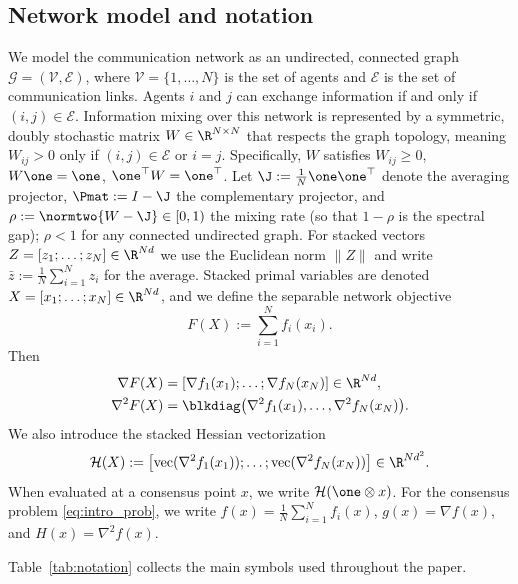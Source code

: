 \documentclass[review,onefignum,onetabnum]{siamart171218}
\begin{document}
	\subsection{Network model and notation}
	We model the communication network as an undirected, connected
	graph $\mathcal{G} = (\mathcal{V}, \mathcal{E})$, where
	$\mathcal{V} = \{1, \dots, N\}$ is the set of agents and
	$\mathcal{E}$ is the set of communication links.
	Agents $i$ and $j$ can exchange information if and only if
	$(i,j) \in \mathcal{E}$.
	Information mixing over this network is represented by a symmetric,
	doubly stochastic matrix $W \in \R^{N \times N}$ that respects
	the graph topology, meaning $W_{ij} > 0$ only if
	$(i,j) \in \mathcal{E}$ or $i=j$.
	Specifically, $W$ satisfies
	$W_{ij}\ge0$, $W\one=\one$, $\one^\top W=\one^\top$.
	Let $\J:=\frac{1}{N}\one\one^\top$ denote the averaging projector,
	$\Pmat:=I-\J$ the complementary projector, and
	$\rho := \normtwo{W-\J}\in[0,1)$ the mixing rate (so that $1{-}\rho$ is the spectral gap);
	$\rho<1$ for any connected undirected graph.
	For stacked vectors $Z=[z_1;\dots;z_N]\in\R^{Nd}$ we use the
	Euclidean norm $\|Z\|$ and write $\bar z:=\frac1N\sum_{i=1}^N z_i$
	for the average.
	Stacked primal variables are denoted
	$X=[x_1;\dots;x_N]\in\R^{Nd}$, and we define the separable
	network objective
	\[
	F(X):=\sum_{i=1}^N f_i(x_i).
	\]
	Then
	\begin{align*}
	\nabla F(X)&=[\nabla f_1(x_1);\dots;\nabla f_N(x_N)]\in\R^{Nd},\\
	\nabla^2 F(X)&=\blkdiag\bigl(\nabla^2 f_1(x_1),\dots,\nabla^2 f_N(x_N)\bigr).
	\end{align*}
	We also introduce the stacked Hessian vectorization
	\[
	\mathcal H(X):=\bigl[\mathrm{vec}(\nabla^2 f_1(x_1));\dots;\mathrm{vec}(\nabla^2 f_N(x_N))\bigr]\in\R^{Nd^2}.
	\]
	When evaluated at a consensus point $x$, we write $\mathcal H(\one\otimes x)$.
	For the consensus problem \eqref{eq:intro_prob}, we write
	$f(x)=\frac1N\sum_{i=1}^N f_i(x)$, $g(x)=\nabla f(x)$, and $H(x)=\nabla^2 f(x)$.
	
	Table~\ref{tab:notation} collects the main symbols used
	throughout the paper.
	
\end{document}
